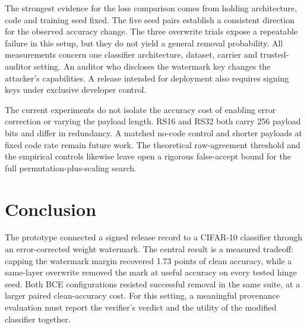 The strongest evidence for the loss comparison comes from holding architecture, code and training seed fixed. The five seed pairs establish a consistent direction for the observed accuracy change. The three overwrite trials expose a repeatable failure in this setup, but they do not yield a general removal probability. All measurements concern one classifier architecture, dataset, carrier and trusted-auditor setting. An auditor who discloses the watermark key changes the attacker's capabilities. A release intended for deployment also requires signing keys under exclusive developer control.

The current experiments do not isolate the accuracy cost of enabling error correction or varying the payload length. RS16 and RS32 both carry 256 payload bits and differ in redundancy. A matched no-code control and shorter payloads at fixed code rate remain future work. The theoretical raw-agreement threshold and the empirical controls likewise leave open a rigorous false-accept bound for the full permutation-plus-scaling search.

\section{Conclusion}
The prototype connected a signed release record to a CIFAR-10 classifier through an error-corrected weight watermark. The central result is a measured tradeoff: capping the watermark margin recovered 1.73 points of clean accuracy, while a same-layer overwrite removed the mark at useful accuracy on every tested hinge seed. Both BCE configurations resisted successful removal in the same suite, at a larger paired clean-accuracy cost. For this setting, a meaningful provenance evaluation must report the verifier's verdict and the utility of the modified classifier together.
